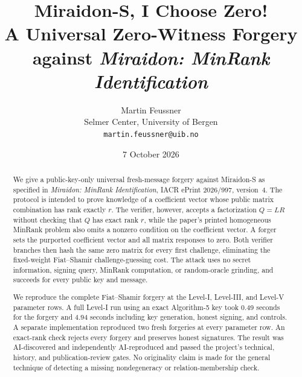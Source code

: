 \documentclass[10pt,a4paper]{article}
\title{\bfseries Miraidon-S, I Choose Zero!\\
\large A Universal Zero-Witness Forgery against \emph{Miraidon: MinRank Identification}}
\author{Martin Feussner\\
\small Selmer Center, University of Bergen\\
\small \texttt{martin.feussner@uib.no}}
\date{7 October 2026}
\begin{document}
\maketitle

\begin{center}
\end{center}
\vspace{0.7em}

\begin{abstract}
We give a public-key-only universal fresh-message forgery against Miraidon-S
as specified in \emph{Miraidon: MinRank Identification}, IACR ePrint
2026/997, version~4.  The protocol is intended to prove knowledge of a
coefficient vector whose public matrix combination has rank exactly $r$.
The verifier, however, accepts a factorization $Q=LR$ without checking that
$Q$ has exact rank $r$, while the paper's printed homogeneous MinRank problem
also omits a nonzero condition on the coefficient vector.  A forger sets the
purported coefficient vector and all matrix responses to zero.  Both verifier
branches then hash the same zero matrix for every first challenge, eliminating
the fixed-weight Fiat--Shamir challenge-guessing cost.  The attack uses no
secret information, signing query, MinRank computation, or random-oracle
grinding, and succeeds for every public key and message.

We reproduce the complete Fiat--Shamir forgery at the Level-I, Level-III, and
Level-V parameter rows.  A full Level-I run using an exact Algorithm-5 key
took 0.49 seconds for the forgery and 4.94 seconds including key generation,
honest signing, and controls.  A separate implementation reproduced two
fresh forgeries at every parameter row.  An exact-rank check rejects every
forgery and preserves honest signatures.  The result was AI-discovered and
independently AI-reproduced and passed the project's technical, history, and
publication-review gates.
No originality claim is made for the general technique of detecting a
missing nondegeneracy or relation-membership check.
\end{abstract}
\end{document}
